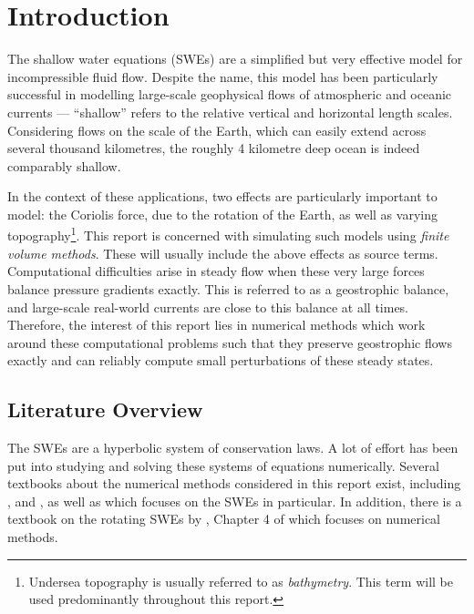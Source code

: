 \chapter{Introduction}
\label{ch:introduction}

The shallow water equations (SWEs) are a simplified but very effective model for incompressible fluid flow. Despite the name, this model has been particularly successful in modelling large-scale geophysical flows of atmospheric and oceanic currents --- ``shallow'' refers to the relative vertical and horizontal length scales. Considering flows on the scale of the Earth, which can easily extend across several thousand kilometres, the roughly 4 kilometre deep ocean is indeed comparably shallow.

In the context of these applications, two effects are particularly important to model: the Coriolis force, due to the rotation of the Earth, as well as varying topography\footnote{Undersea topography is usually referred to as \emph{bathymetry}. This term will be used predominantly throughout this report.}. This report is concerned with simulating such models using \emph{finite volume methods}. These will usually include the above effects as source terms. Computational difficulties arise in steady flow when these very large forces balance pressure gradients exactly. This is referred to as a geostrophic balance, and large-scale real-world currents are close to this balance at all times. Therefore, the interest of this report lies in numerical methods which work around these computational problems such that they preserve geostrophic flows exactly and can reliably compute small perturbations of these steady states.

\section{Literature Overview}

The SWEs are a hyperbolic system of conservation laws. A lot of effort has been put into studying and solving these systems of equations numerically. Several textbooks about the numerical methods considered in this report exist, including \citet{leveque1992numerical}, \citet{toro1999riemann} and \citet{leveque2002finite}, as well as \citet{toro2001shock} which focuses on the SWEs in particular. In addition, there is a textbook on the rotating SWEs by \citet{zeitlin2007nonlinear}, Chapter 4 of which focuses on numerical methods.

